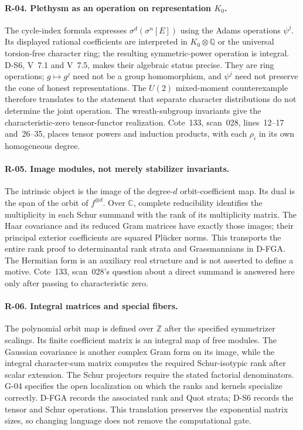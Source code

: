 \documentclass[11pt,a4paper]{article}
\theoremstyle{definition}\newtheorem{definition}{Definition}
\begin{document}
\paragraph{R-04. Plethysm as an operation on representation $K_0$.}
The cycle-index formula expresses $\sigma^d(\sigma^n[E])$ using the Adams operations $\psi^j$. Its displayed rational coefficients are interpreted in $K_0\otimes\mathbb Q$ or the universal torsion-free character ring; the resulting symmetric-power operation is integral. D-S6, V~7.1 and V~7.5, makes their algebraic status precise. They are ring operations; $g\mapsto g^j$ need not be a group homomorphism, and $\psi^j$ need not preserve the cone of honest representations. The $U(2)$ mixed-moment counterexample therefore translates to the statement that separate character distributions do not determine the joint operation. The wreath-subgroup invariants give the characteristic-zero tensor-functor realization. Cote~133, scan~028, lines~12--17 and~26--35, places tensor powers and induction products, with each $\rho_i$ in its own homogeneous degree.

\paragraph{R-05. Image modules, not merely stabilizer invariants.}
The intrinsic object is the image of the degree-$d$ orbit-coefficient map. Its dual is the span of the orbit of $f^{\otimes d}$. Over $\mathbb C$, complete reducibility identifies the multiplicity in each Schur summand with the rank of its multiplicity matrix. The Haar covariance and its reduced Gram matrices have exactly those images; their principal exterior coefficients are squared Pl\"ucker norms. This transports the entire rank proof to determinantal rank strata and Grassmannians in D-FGA. The Hermitian form is an auxiliary real structure and is not asserted to define a motive. Cote~133, scan~028's question about a direct summand is answered here only after passing to characteristic zero.

\paragraph{R-06. Integral matrices and special fibers.}
The polynomial orbit map is defined over $\mathbb Z$ after the specified symmetrizer scalings. Its finite coefficient matrix is an integral map of free modules. The Gaussian covariance is another complex Gram form on its image, while the integral character-sum matrix computes the required Schur-isotypic rank after scalar extension. The Schur projectors require the stated factorial denominators. G-04 specifies the open localization on which the ranks and kernels specialize correctly. D-FGA records the associated rank and Quot strata; D-S6 records the tensor and Schur operations. This translation preserves the exponential matrix sizes, so changing language does not remove the computational gate.
\end{document}
